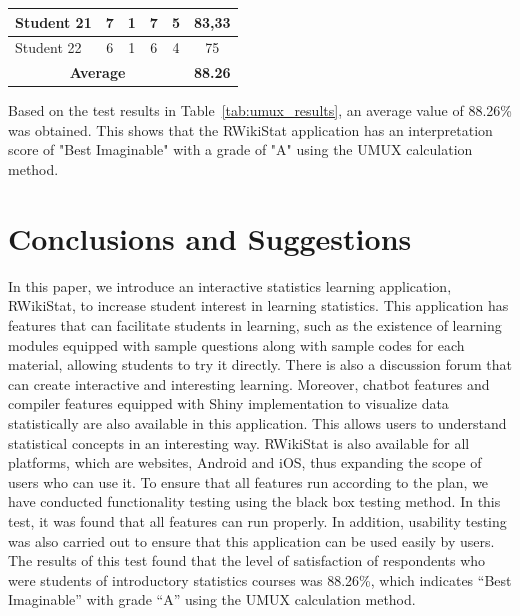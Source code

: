 \documentclass[conference,a4paper]{IEEEtran}
\begin{document}
\begin{table}[htbp]
{\begin{tabular}{|l|c|c|c|c|c|}
      Student 21                             & 7                                             & 1                                     & 7          & 5          & 83,33 \\ \hline
      Student 22                             & 6                                             & 1                                     & 6          & 4          & 75    \\ \hline
      \multicolumn{5}{|c|}{\textbf{Average}} & \textbf{88.26}                                                                                                          \\ \hline
    \end{tabular}%
  }
\end{table}

Based on the test results in Table~\ref{tab:umux_results}, an average value of 88.26\% was obtained. This shows that the RWikiStat application has an interpretation score of "Best Imaginable" with a grade of "A" using the UMUX calculation method.



\section{Conclusions and Suggestions}
\label{sect:conclusion}

In this paper, we introduce an interactive statistics learning application, RWikiStat, to increase student interest in learning statistics. This application has features that can facilitate students in learning, such as the existence of learning modules equipped with sample questions along with sample codes for each material, allowing students to try it directly. There is also a discussion forum that can create interactive and interesting learning. Moreover, chatbot features and compiler features equipped with Shiny implementation to visualize data statistically are also available in this application. This allows users to understand statistical concepts in an interesting way. RWikiStat is also available for all platforms, which are websites, Android and iOS, thus expanding the scope of users who can use it. To ensure that all features run according to the plan, we have conducted functionality testing using the black box testing method. In this test, it was found that all features can run properly. In addition, usability testing was also carried out to ensure that this application can be used easily by users. The results of this test found that the level of satisfaction of respondents who were students of introductory statistics courses was 88.26\%, which indicates “Best Imaginable” with grade “A” using the UMUX calculation method.
\end{document}

